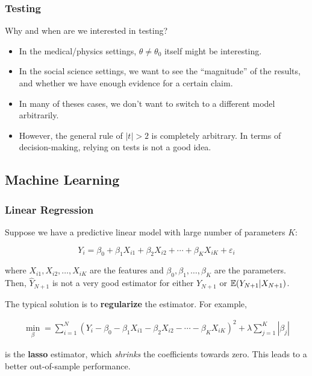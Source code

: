 \subsubsection{Testing}

Why and when are we interested in testing?

\begin{itemize}
    \item In the medical/physics settings, $\theta\neq\theta_0$ itself might be interesting.
    \item In the social science settings, we want to see the ``magnitude'' of the results, and whether we have enough evidence for a certain claim.
    \item In many of theses cases, we don't want to switch to a different model arbitrarily.
    \item However, the general rule of $|t| > 2$ is completely arbitrary. In terms of decision-making, relying on tests is not a good idea.
\end{itemize}

\subsection{Machine Learning}

\subsubsection{Linear Regression}
Suppose we have a predictive linear model with large number of parameters $K$:

$$
Y_i = \beta_0 + \beta_1 X_{i1} + \beta_2 X_{i2} + \cdots + \beta_K X_{iK} + \varepsilon_i
$$

where $X_{i1}, X_{i2}, \ldots, X_{iK}$ are the features and $\beta_0, \beta_1, \ldots, \beta_K$ are the parameters.
Then, $\hat{Y}_{N+1}$ is not a very good estimator for either $Y_{N+1}$ or ${\mathbb{E}}(Y_{N+1}|X_{N+1})$.

The typical solution is to \textbf{regularize} the estimator. For example,

\begin{align}
    \min_\beta = \sum_{i=1}^N (Y_i - \beta_0 - \beta_1 X_{i1} - \beta_2 X_{i2} - \cdots - \beta_K X_{iK})^2 + \lambda \sum_{j=1}^K |\beta_j|
\end{align}

is the \textbf{lasso} estimator, which \textit{shrinks} the coefficients towards zero. This leads to a better out-of-sample performance.

